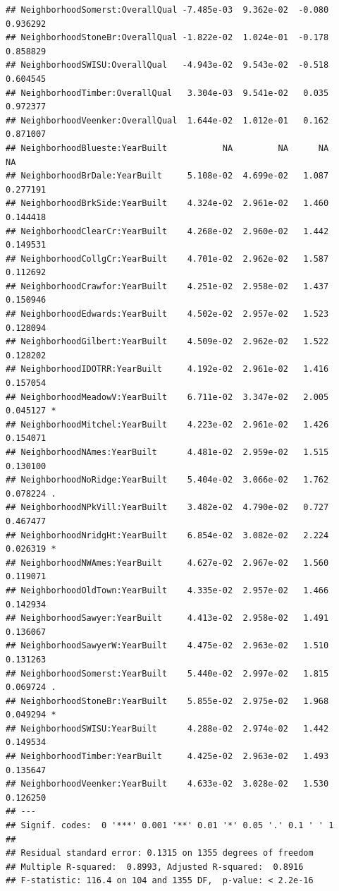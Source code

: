 \documentclass[american,]{article}
\theoremstyle{definition}
\theoremstyle{definition}
\theoremstyle{definition}
\theoremstyle{remark}
\begin{document}
\begin{verbatim}
## NeighborhoodSomerst:OverallQual -7.485e-03  9.362e-02  -0.080 0.936292    
## NeighborhoodStoneBr:OverallQual -1.822e-02  1.024e-01  -0.178 0.858829    
## NeighborhoodSWISU:OverallQual   -4.943e-02  9.543e-02  -0.518 0.604545    
## NeighborhoodTimber:OverallQual   3.304e-03  9.541e-02   0.035 0.972377    
## NeighborhoodVeenker:OverallQual  1.644e-02  1.012e-01   0.162 0.871007    
## NeighborhoodBlueste:YearBuilt           NA         NA      NA       NA    
## NeighborhoodBrDale:YearBuilt     5.108e-02  4.699e-02   1.087 0.277191    
## NeighborhoodBrkSide:YearBuilt    4.324e-02  2.961e-02   1.460 0.144418    
## NeighborhoodClearCr:YearBuilt    4.268e-02  2.960e-02   1.442 0.149531    
## NeighborhoodCollgCr:YearBuilt    4.701e-02  2.962e-02   1.587 0.112692    
## NeighborhoodCrawfor:YearBuilt    4.251e-02  2.958e-02   1.437 0.150946    
## NeighborhoodEdwards:YearBuilt    4.502e-02  2.957e-02   1.523 0.128094    
## NeighborhoodGilbert:YearBuilt    4.509e-02  2.962e-02   1.522 0.128202    
## NeighborhoodIDOTRR:YearBuilt     4.192e-02  2.961e-02   1.416 0.157054    
## NeighborhoodMeadowV:YearBuilt    6.711e-02  3.347e-02   2.005 0.045127 *  
## NeighborhoodMitchel:YearBuilt    4.223e-02  2.961e-02   1.426 0.154071    
## NeighborhoodNAmes:YearBuilt      4.481e-02  2.959e-02   1.515 0.130100    
## NeighborhoodNoRidge:YearBuilt    5.404e-02  3.066e-02   1.762 0.078224 .  
## NeighborhoodNPkVill:YearBuilt    3.482e-02  4.790e-02   0.727 0.467477    
## NeighborhoodNridgHt:YearBuilt    6.854e-02  3.082e-02   2.224 0.026319 *  
## NeighborhoodNWAmes:YearBuilt     4.627e-02  2.967e-02   1.560 0.119071    
## NeighborhoodOldTown:YearBuilt    4.335e-02  2.957e-02   1.466 0.142934    
## NeighborhoodSawyer:YearBuilt     4.413e-02  2.958e-02   1.491 0.136067    
## NeighborhoodSawyerW:YearBuilt    4.475e-02  2.963e-02   1.510 0.131263    
## NeighborhoodSomerst:YearBuilt    5.440e-02  2.997e-02   1.815 0.069724 .  
## NeighborhoodStoneBr:YearBuilt    5.855e-02  2.975e-02   1.968 0.049294 *  
## NeighborhoodSWISU:YearBuilt      4.288e-02  2.974e-02   1.442 0.149534    
## NeighborhoodTimber:YearBuilt     4.425e-02  2.963e-02   1.493 0.135647    
## NeighborhoodVeenker:YearBuilt    4.633e-02  3.028e-02   1.530 0.126250    
## ---
## Signif. codes:  0 '***' 0.001 '**' 0.01 '*' 0.05 '.' 0.1 ' ' 1
## 
## Residual standard error: 0.1315 on 1355 degrees of freedom
## Multiple R-squared:  0.8993, Adjusted R-squared:  0.8916 
## F-statistic: 116.4 on 104 and 1355 DF,  p-value: < 2.2e-16
\end{verbatim}
\end{document}
